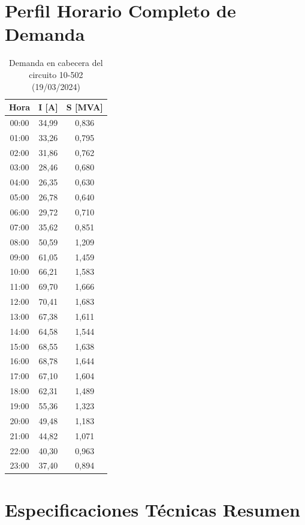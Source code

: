 \section{Perfil Horario Completo de Demanda}

\begin{table}[H]
    \centering
    \small
    \caption{Demanda en cabecera del circuito 10-502 (19/03/2024)}
    \begin{tabular}{ccc}
    \toprule
    \textbf{Hora} & \textbf{I [A]} & \textbf{S [MVA]} \\
    \midrule
    00:00 & 34,99 & 0,836 \\
    01:00 & 33,26 & 0,795 \\
    02:00 & 31,86 & 0,762 \\
    03:00 & 28,46 & 0,680 \\
    04:00 & 26,35 & 0,630 \\
    05:00 & 26,78 & 0,640 \\
    06:00 & 29,72 & 0,710 \\
    07:00 & 35,62 & 0,851 \\
    08:00 & 50,59 & 1,209 \\
    09:00 & 61,05 & 1,459 \\
    10:00 & 66,21 & 1,583 \\
    11:00 & 69,70 & 1,666 \\
    12:00 & 70,41 & 1,683 \\
    13:00 & 67,38 & 1,611 \\
    14:00 & 64,58 & 1,544 \\
    15:00 & 68,55 & 1,638 \\
    16:00 & 68,78 & 1,644 \\
    17:00 & 67,10 & 1,604 \\
    18:00 & 62,31 & 1,489 \\
    19:00 & 55,36 & 1,323 \\
    20:00 & 49,48 & 1,183 \\
    21:00 & 44,82 & 1,071 \\
    22:00 & 40,30 & 0,963 \\
    23:00 & 37,40 & 0,894 \\
    \bottomrule
    \end{tabular}
\end{table}

\section{Especificaciones Técnicas Resumen}

